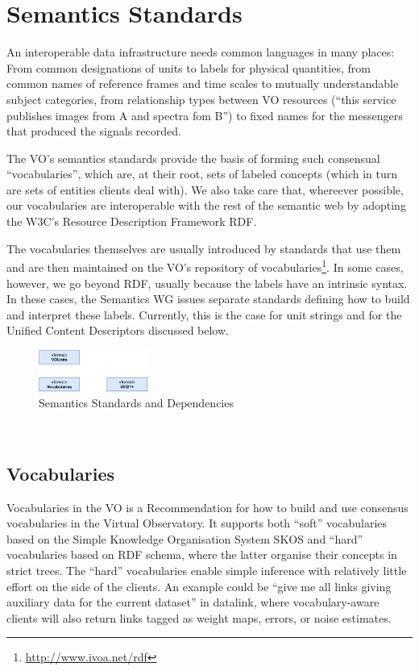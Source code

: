 \documentclass[11pt,a4paper]{ivoa}
\begin{document}
\section{Semantics Standards}

An interoperable data infrastructure needs common languages in many
places: From common designations of units to labels for physical
quantities, from common names of reference frames and time scales to
mutually understandable subject categories, from relationship types
between VO resources (``this service publishes images from A and spectra
fom B'') to fixed names for the messengers that produced the signals
recorded.

The VO's semantics standards provide the basis of forming such
consensual ``vocabularies'', which are, at their root, sets of labeled
concepts (which in turn are sets of entities clients deal with).  We
also take care that, whereever possible, our vocabularies are
interoperable with the rest of the semantic web by adopting the W3C's
Resource Description Framework RDF.

The vocabularies themselves are usually introduced by standards that use
them and are then maintained on the VO's repository of
vocabularies\footnote{\url{http://www.ivoa.net/rdf}}.  In some cases,
however, we go beyond RDF, usually because the labels have an intrinsic
syntax.  In these cases, the Semantics WG issues separate standards
defining how to build and interpret these labels.  Currently, this is
the case for unit strings and for the Unified Content Descriptors
discussed below.

\begin{figure}[h]
\centering
\includegraphics[width=0.32\textwidth]{ivoa-arch-semantics.pdf}
\caption{Semantics Standards and Dependencies}
\label{fig:semdeps}
\end{figure}
\
\subsection{Vocabularies}

Vocabularies in the VO is a Recommendation for how to build and use
consensus vocabularies in the Virtual Observatory.  It supports both
``soft'' vocabularies based on the Simple Knowledge Organisation System
SKOS and ``hard'' vocabularies based on RDF schema, where the latter
organise their concepts in strict trees.  The ``hard'' vocabularies
enable simple inference with relatively little effort on the side of
the clients.  An example could be ``give me all links giving auxiliary
data for the current dataset'' in datalink, where vocabulary-aware
clients will also return links tagged as weight maps, errors, or noise
estimates.
\end{document}
